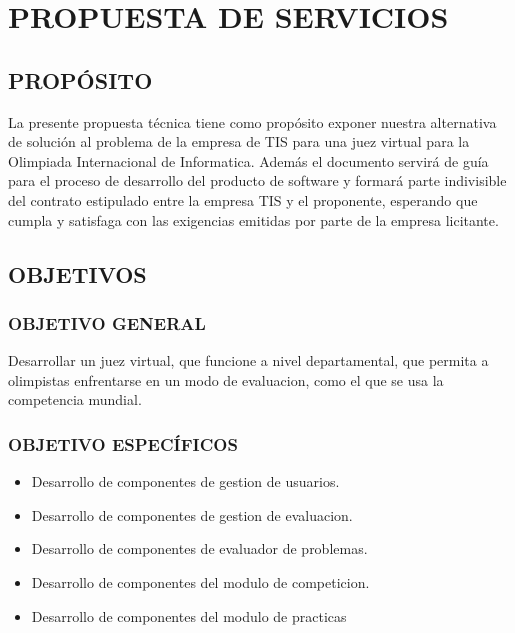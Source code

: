 \section{PROPUESTA DE SERVICIOS}

\subsection{PROPÓSITO}
La presente propuesta técnica tiene como propósito exponer nuestra alternativa de solución al problema de la empresa de TIS para una juez virtual para la Olimpiada Internacional de Informatica. Además el documento servirá de guía para el proceso de desarrollo del producto de software y formará parte indivisible del contrato estipulado entre la empresa TIS y el proponente, esperando que cumpla y satisfaga con las exigencias emitidas por parte de la empresa licitante.

\subsection{OBJETIVOS}

\subsubsection{OBJETIVO GENERAL}

Desarrollar un juez virtual, que funcione a nivel departamental, que permita a olimpistas enfrentarse en un modo de evaluacion, como el que se usa la competencia mundial.

\subsubsection{OBJETIVO ESPECÍFICOS}
\begin{itemize}
    \item Desarrollo de componentes de gestion de usuarios. %
    \item Desarrollo de componentes de gestion de evaluacion. %
    \item Desarrollo de componentes de evaluador de problemas.%
    \item Desarrollo de componentes del modulo de competicion.%
    \item Desarrollo de componentes del modulo de practicas %

\end{itemize}

